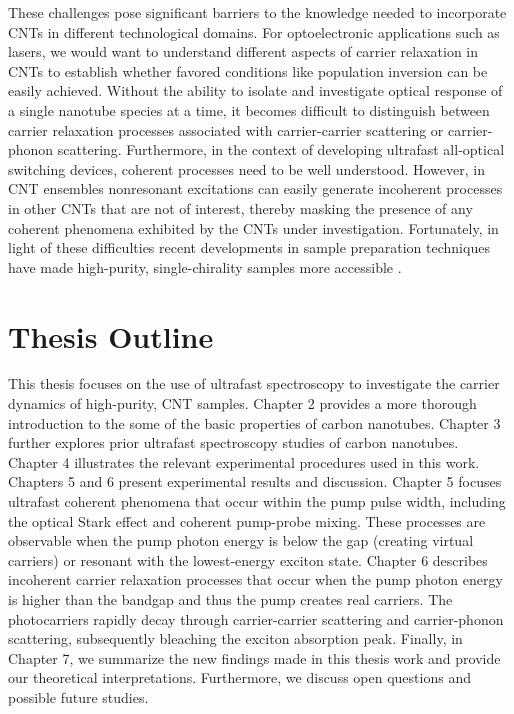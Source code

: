 These challenges pose significant barriers to the knowledge needed to incorporate CNTs in different technological domains. For optoelectronic applications such as lasers, we would want to understand different aspects of carrier relaxation in CNTs to establish whether favored conditions like population inversion can be easily achieved. Without the ability to isolate and investigate optical response of a single nanotube species at a time, it becomes difficult to distinguish between carrier relaxation processes associated with carrier-carrier scattering or carrier-phonon scattering. Furthermore, in the context of developing ultrafast all-optical switching devices, coherent processes need to be well understood. However, in CNT ensembles nonresonant excitations can easily generate incoherent processes in other CNTs that are not of interest, thereby masking the presence of any coherent phenomena exhibited by the CNTs under investigation. Fortunately, in light of these difficulties recent developments in sample preparation techniques have made high-purity, single-chirality samples more accessible \cite{liu2011large, ichinose2017extraction}.


\section{Thesis Outline}

This thesis focuses on the use of ultrafast spectroscopy to investigate the carrier dynamics of high-purity, CNT samples. Chapter 2 provides a more thorough introduction to the some of the basic properties of carbon nanotubes. Chapter 3 further explores prior ultrafast spectroscopy studies of carbon nanotubes. Chapter 4 illustrates the relevant experimental procedures used in this work. Chapters 5 and 6 present experimental results and discussion.  Chapter 5 focuses ultrafast coherent phenomena that occur within the pump pulse width, including the optical Stark effect and coherent pump-probe mixing.  These processes are observable when the pump photon energy is below the gap (creating virtual carriers) or resonant with the lowest-energy exciton state.  Chapter 6 describes incoherent carrier relaxation processes that occur when the pump photon energy is higher than the bandgap and thus the pump creates real carriers. The photocarriers rapidly decay through carrier-carrier scattering and carrier-phonon scattering, subsequently bleaching the exciton absorption peak.  Finally, in Chapter 7, we summarize the new findings made in this thesis work and provide our theoretical interpretations.  Furthermore, we discuss open questions and possible future studies.

